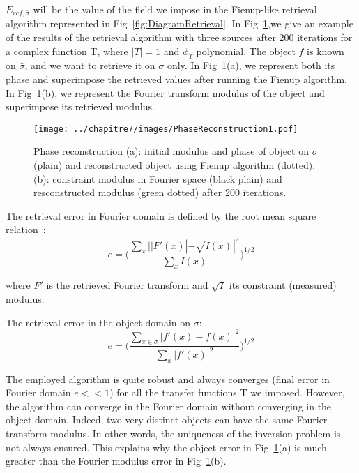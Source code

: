 \noindent $E_{ref,\bar{\sigma}}$ will be the value of the field we impose in the Fienup-like retrieval algorithm represented in Fig~\ref{fig:DiagramRetrieval}. In Fig~\ref{fig:PhaseReconstruction1},we give an example of the results of the retrieval algorithm with three sources after 200 iterations for a complex function T, where $|T|=1$ and $\phi_T$ polynomial. The object $f$ is known on $\bar{\sigma}$, and we want to retrieve it on $\sigma$ only. In Fig~\ref{fig:PhaseReconstruction1}(a), we represent both its phase and superimpose the retrieved values after running the Fienup algorithm. In Fig~\ref{fig:PhaseReconstruction1}(b), we represent the Fourier transform modulus of the object and superimpose its retrieved modulus.\\

 \begin{figure}[H]
\centering
\texttt{[image: ../chapitre7/images/PhaseReconstruction1.pdf]}\\
\caption{\label{fig:PhaseReconstruction1} Phase reconstruction (a): initial modulus and phase of object on $\sigma$ (plain) and reconstructed object using Fienup algorithm (dotted). (b): constraint modulus in Fourier space (black plain) and resconstructed modulus (green dotted) after 200 iterations.}
\end{figure}

\noindent The retrieval error in Fourier domain is defined by the root mean square relation~\cite{Fienup1987}:
\begin{equation}
e = \biggl(\frac{\sum_{x}||F'(x)|-\sqrt{I(x)}|^2}{\sum_{x}I(x)}\biggr)^{1/2}
\end{equation}

\noindent where $F'$ is the retrieved Fourier transform and $\sqrt{I}$ its constraint (measured) modulus.

\noindent The retrieval error in the object domain on $\sigma$:
\begin{equation}
e = \biggl(\frac{\sum_{x\in \sigma}|f'(x)-f(x)|^2}{\sum_{x}|f'(x)|^2}\biggr)^{1/2}
\end{equation}


\noindent The employed algorithm is quite robust and always converges (final error in Fourier domain $e << 1$) for all the transfer functions T we imposed. However, the algorithm can converge in the Fourier domain without converging in the object domain.
Indeed, two very distinct objects can have the same Fourier transform modulus. In other words, the uniqueness of the inversion problem is not always ensured. This explains why the object error in Fig~\ref{fig:PhaseReconstruction1}(a) is much greater than the Fourier modulus error in Fig~\ref{fig:PhaseReconstruction1}(b). 

